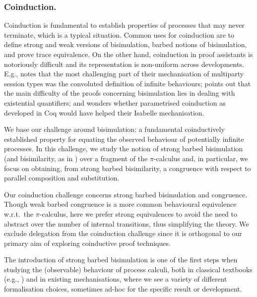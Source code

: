 \documentclass[runningheads]{llncs}
\begin{document}
\subsubsection{Coinduction.}
Coinduction is fundamental to establish properties of processes that
may never terminate, which is a typical situation.
Common uses for coinduction are to define strong and weak versions of
bisimulation, barbed notions of bisimulation, and prove trace equivalence.
On the other hand, coinduction in proof assistants
is notoriously difficult and its representation
is non-uniform across developments.
E.g., \cite{Castro-Perez2021} notes that the most challenging
part of their mechanisation of multiparty session types
was the convoluted definition of infinite behaviours;
\cite{Pohjola2022} points out that the main difficulty
of the proofs concerning bisimulation lies
in dealing with existential quantifiers; and
\cite{Bengtson2016} wonders whether parametrised
coinduction as developed in Coq \cite{Hur2013} would
have helped their Isabelle mechanisation.


We base our challenge around bisimulation: a fundamental coinductively
established property for equating the
observed behaviour of potentially infinite processes. 
In this challenge, we study the notion of strong barbed bisimulation
(and bisimilarity, as in \cite{picalcbook})
over a fragment of the $\pi$-calculus and,
in particular, we focus on obtaining,
from strong barbed bisimilarity,
a congruence with respect to
parallel composition and substitution.


Our coinduction challenge concerns strong barbed bisimulation and
congruence.%
Though weak barbed congruence is a more common behavioural equivalence
w.r.t.\ the \(\pi\)-calculus, here we prefer strong equivalences to avoid the
need to abstract over the number of internal transitions, thus
simplifying the theory.  We exclude delegation from the coinduction
challenge since it is orthogonal to our primary aim of exploring
coinductive proof techniques.

The introduction of strong barbed bisimulation is one of the first
steps when studying the (observable) behaviour of process calculi,
both in classical textbooks (e.g., \cite{picalcbook}) and in existing
mechanisations, where we see a variety of different formalisation
choices, sometimes ad-hoc for the specific result or development.
\end{document}

